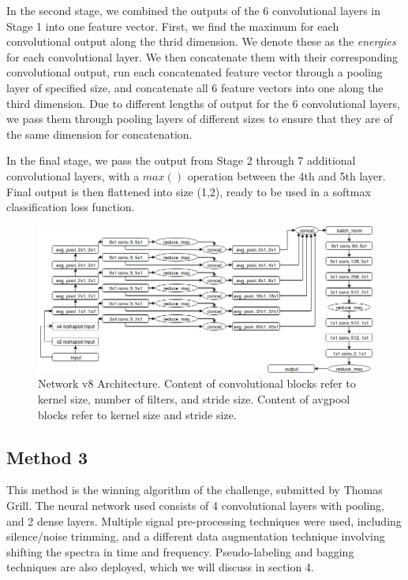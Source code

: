 \documentclass[10pt,twocolumn,letterpaper]{article}
\begin{document}
In the second stage, we combined the outputs of the 6 convolutional layers
in Stage 1 into one feature vector. First, we find the maximum for each
convolutional output along the thrid dimension. We denote these as the
\textit{energies} for each convolutional layer. We then concatenate them
with their corresponding convolutional output, run each concatenated
feature vector through a pooling layer of specified size, and concatenate
all 6 feature vectors into one along the third dimension. Due to different
lengths of output for the 6 convolutional layers, we pass them through
pooling layers of different sizes to ensure that they are of the same
dimension for concatenation.

In the final stage, we pass the output from Stage 2 through 7 additional
convolutional layers, with a \(max()\) operation between the 4th and 5th
layer. Final output is then flattened into size (1,2), ready to be used in
a softmax classification loss function.

\begin{figure}
	\centering
	\includegraphics[width=\textwidth]{v8_diagram}
	\caption{Network v8 Architecture. Content of convolutional blocks refer
	to kernel size, number of filters, and stride size. Content of avgpool
	blocks refer to kernel size and stride size.}
\end{figure}

\subsection{Method 3}


This method is the winning algorithm of the challenge, submitted by Thomas
Grill. The neural network used consists of 4 convolutional layers with
pooling, and 2 dense layers. Multiple signal pre-processing techniques were
used, including silence/noise trimming, and a different data augmentation
technique involving shifting the spectra in time and frequency.
Pseudo-labeling and bagging techniques are also deployed, which we will
discuss in section 4.
\end{document}
